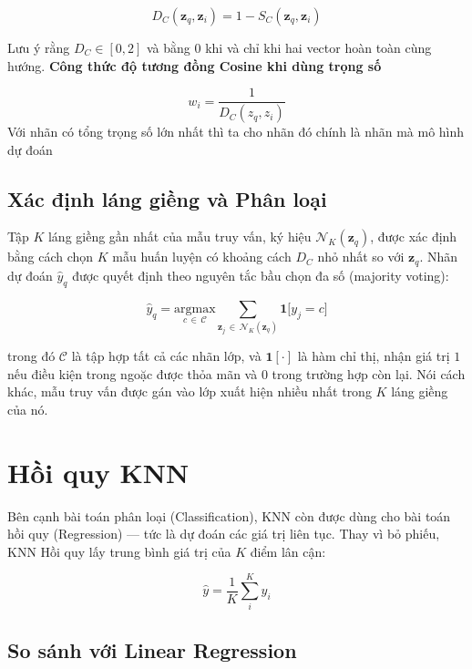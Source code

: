 \documentclass[12pt,a4paper]{article}
\begin{document}
\begin{equation}
    D_C(\mathbf{z}_q, \mathbf{z}_i) = 1 - S_C(\mathbf{z}_q, \mathbf{z}_i)
\end{equation}

Lưu ý rằng $D_C \in [0, 2]$ và bằng $0$ khi và chỉ khi hai vector hoàn
toàn cùng hướng.
\textbf{Công thức độ tương đồng Cosine khi dùng trọng số}

\begin{equation}
    w_i=\frac{1}{D_C(z_q,z_i)}
\end{equation} 
Với nhãn có tổng trọng số lớn nhất thì ta cho nhãn đó chính là nhãn mà mô hình dự đoán 
\subsection{Xác định láng giềng và Phân loại}

Tập $K$ láng giềng gần nhất của mẫu truy vấn, ký hiệu
$\mathcal{N}_K(\mathbf{z}_q)$, được xác định bằng cách chọn $K$ mẫu
huấn luyện có khoảng cách $D_C$ nhỏ nhất so với $\mathbf{z}_q$.
Nhãn dự đoán $\hat{y}_q$ được quyết định theo nguyên tắc bầu chọn đa số
(majority voting):

\begin{equation}
    \hat{y}_q
    = \underset{c \,\in\, \mathcal{C}}{\mathrm{argmax}}
      \sum_{\mathbf{z}_j \,\in\, \mathcal{N}_K(\mathbf{z}_q)}
      \mathbf{1}\bigl[y_j = c\bigr]
\end{equation}

trong đó $\mathcal{C}$ là tập hợp tất cả các nhãn lớp, và
$\mathbf{1}[\cdot]$ là hàm chỉ thị, nhận giá trị $1$ nếu điều kiện trong
ngoặc được thỏa mãn và $0$ trong trường hợp còn lại. Nói cách khác, mẫu
truy vấn được gán vào lớp xuất hiện nhiều nhất trong $K$ láng giềng của nó.
\section{Hồi quy KNN}

Bên cạnh bài toán phân loại (Classification), KNN còn được dùng cho bài toán hồi quy (Regression) — tức là dự đoán các giá trị liên tục. Thay vì bỏ phiếu, KNN Hồi quy lấy trung bình giá trị của $K$ điểm lân cận:

\begin{equation}
    \hat{y} = \frac{1}{K} \sum_{i}^{K} y_i
\end{equation}



\subsection{So sánh với Linear Regression}
\end{document}
